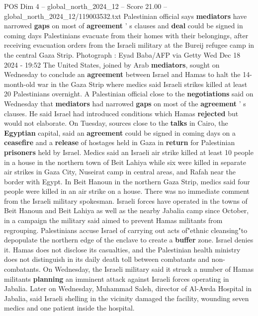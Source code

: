 \begin{textsample}{POS Dim 4 – global\_north\_2024\_12 – Score 21.00 – global\_north\_2024\_12/119003532.txt}  \label{ex:f4_pos_329}
Palestinian official says \textbf{mediators} have narrowed \textbf{gaps} on most of \textbf{agreement} ' s clauses and \textbf{deal} could be signed in coming days Palestinians evacuate from their homes with their belongings, after receiving evacuation orders from the Israeli military at the Bureij refugee camp in the central Gaza Strip.
Photograph : Eyad Baba/AFP via Getty Wed Dec 18 2024 - 19:52 The United States, joined by Arab \textbf{mediators}, sought on Wednesday to conclude an \textbf{agreement} between Israel and Hamas to halt the 14-month-old war in the Gaza Strip where medics said Israeli strikes killed at least 20 Palestinians overnight.
A Palestinian official close to the \textbf{negotiations} said on Wednesday that \textbf{mediators} had narrowed \textbf{gaps} on most of the \textbf{agreement} ' s clauses.
He said Israel had introduced conditions which Hamas \textbf{rejected} but would not elaborate.
On Tuesday, sources close to the \textbf{talks} in Cairo, the \textbf{Egyptian} capital, said an \textbf{agreement} could be signed in coming days on a \textbf{ceasefire} and a \textbf{release} of hostages held in Gaza in \textbf{return} for Palestinian \textbf{prisoners} held by Israel.
Medics said an Israeli air strike killed at least 10 people in a house in the northern town of Beit Lahiya while six were killed in separate air strikes in Gaza City, Nuseirat camp in central areas, and Rafah near the border with Egypt.
In Beit Hanoun in the northern Gaza Strip, medics said four people were killed in an air strike on a house.
There was no immediate comment from the Israeli military spokesman.
Israeli forces have operated in the towns of Beit Hanoun and Beit Lahiya as well as the nearby Jabalia camp since October, in a campaign the military said aimed to prevent Hamas militants from regrouping.
Palestinians accuse Israel of carrying out acts of"ethnic cleansing"to depopulate the northern edge of the enclave to create a \textbf{buffer} zone.
Israel denies it.
Hamas does not disclose its casualties, and the Palestinian health ministry does not distinguish in its daily death toll between combatants and non-combatants.
On Wednesday, the Israeli military said it struck a number of Hamas militants \textbf{planning} an imminent attack against Israeli forces operating in Jabalia.
Later on Wednesday, Muhammad Saleh, director of Al-Awda Hospital in Jabalia, said Israeli shelling in the vicinity damaged the facility, wounding seven medics and one patient inside the hospital.

\end{textsample}
